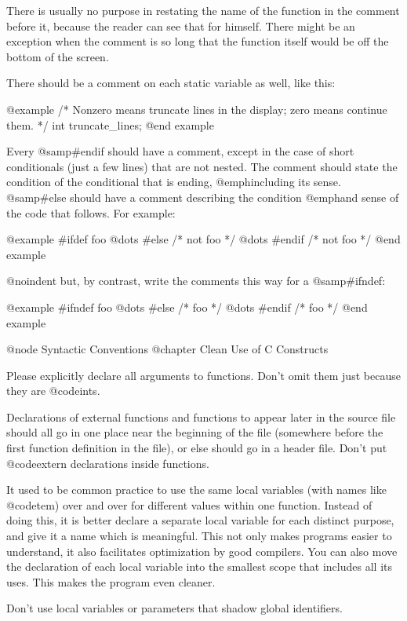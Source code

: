 There is usually no purpose in restating the name of the function in
the comment before it, because the reader can see that for himself.
There might be an exception when the comment is so long that the function
itself would be off the bottom of the screen.

There should be a comment on each static variable as well, like this:

@example
/* Nonzero means truncate lines in the display;
   zero means continue them.  */
int truncate_lines;
@end example

Every @samp{#endif} should have a comment, except in the case of short
conditionals (just a few lines) that are not nested.  The comment should
state the condition of the conditional that is ending, @emph{including
its sense}.  @samp{#else} should have a comment describing the condition
@emph{and sense} of the code that follows.  For example:

@example
#ifdef foo
  @dots{}
#else /* not foo */
  @dots{}
#endif /* not foo */
@end example

@noindent
but, by contrast, write the comments this way for a @samp{#ifndef}:

@example
#ifndef foo
  @dots{}
#else /* foo */
  @dots{}
#endif /* foo */
@end example


@node Syntactic Conventions
@chapter Clean Use of C Constructs

Please explicitly declare all arguments to functions.
Don't omit them just because they are @code{int}s.

Declarations of external functions and functions to appear later in the
source file should all go in one place near the beginning of the file
(somewhere before the first function definition in the file), or else
should go in a header file.  Don't put @code{extern} declarations inside
functions.

It used to be common practice to use the same local variables (with
names like @code{tem}) over and over for different values within one
function.  Instead of doing this, it is better declare a separate local
variable for each distinct purpose, and give it a name which is
meaningful.  This not only makes programs easier to understand, it also
facilitates optimization by good compilers.  You can also move the
declaration of each local variable into the smallest scope that includes
all its uses.  This makes the program even cleaner.

Don't use local variables or parameters that shadow global identifiers.


